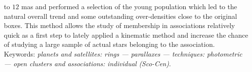 to $12$ mas and performed a selection of the young population which led to the natural overall trend and some outstanding over-densities close to the original boxes. This method allows the study of membership in associations relatively quick as a first step to lately applied a kinematic method and increase the chance of studying a large sample of actual stars belonging to the association.\medskip \\

Keywords: \textit{planets and satellites: rings --- parallaxes --- techniques: photometric --- open clusters and associations: individual (Sco-Cen)}.

\endgroup			

\vfill